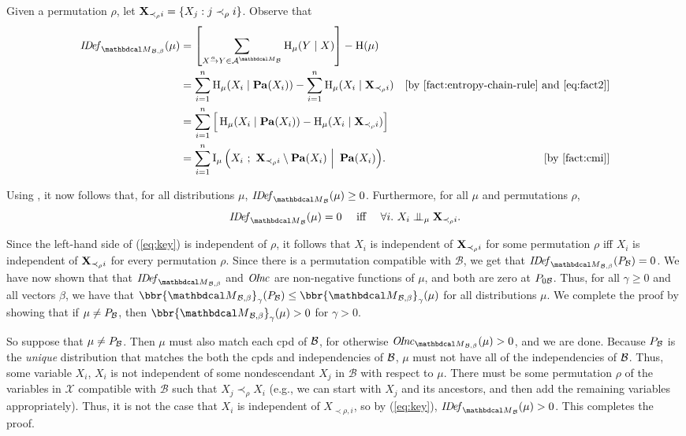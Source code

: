 \begin{subappendices}
\begin{lproof}
Given a permutation $\rho$, let ${\bf X}_{\prec_\rho i} = \{X_j: j
\prec_\rho i\}$.  Observe that 
\begin{align*}
    \IDef_{\PDGof{\mathcal B,\beta}}(\mu)
 	&= \left[\sum_{\ed aXY \in \Ar^{\PDGof{\mathcal B}}} \H_\mu(Y\mid X) \right] - \H(\mu) \\
	&= \sum_{i=1}^n \H_\mu(X_i \mid \Pa(X_i)) - \sum_{i = 1}^n
\H_\mu(X_i \mid {\bf X}_{\prec_\rho i}) & \text{[by
    \Cref{fact:entropy-chain-rule} and \eqref{eq:fact2}]}\\ 
	&= \sum_{i=1}^n \Big[\H_\mu(X_i \mid \Pa(X_i)) - \H_\mu(X_i
  \mid {\bf X}_{\prec_\rho i} )\Big] \\ 
      &= \sum_{i=1}^n \I_\mu \Big( X_i ~;~ {\bf X}_{\prec_\rho i}
    \setminus \Pa(X_i) ~\Big|~ \Pa(X_i) \Big). & \text{[by
        \Cref{fact:cmi}]} 
\end{align*}

Using , it now follows that,
for all distributions $\mu$,
$\IDef_{\PDGof{\mathcal B}}(\mu) \ge 0$.
Furthermore, for all $\mu$ and permutations $\rho$,
\begin{equation}\label{eq:key}
  \IDef_{\PDGof{\mathcal B}}(\mu) = 0 \quad\mbox{ iff }\quad 
    \forall i.~X_i \CI_\mu {\bf X}_{\prec_\rho i}.
\end{equation}

Since the left-hand side of (\ref{eq:key}) is independent of $\rho$,
it follows that $X_i$ is independent of 
${\bf X}_{\prec_\rho i}$ for some permutation $\rho$ iff $X_i$ is independent of
  ${\bf X}_{\prec_\rho i}$ for every permutation $\rho$.  Since there
is a permutation compatible with $\mathcal B$, we get that 
$\IDef_{\PDGof{\mathcal B,\beta}}(\Pr_{\cal B}) = 0$.
We have now shown that that $\IDef_{\PDGof{\mathcal B, \beta}}$ and $\OInc$ are 
non-negative functions of $\mu$, and both are zero at $\Pr_{0\cal B}$. 
Thus, for all $\gamma \geq 0$ and all vectors $\beta$, we
have that   $\bbr{\PDGof{\mathcal B, \beta}}_\gamma( \Pr_{\cal
  B}) \le \bbr{\PDGof{\mathcal B, \beta}}_\gamma( \mu)$ for all
distributions $\mu$.  We complete the proof by showing that if
$\mu \ne \Pr_{\cal B}$, then 
$\bbr{\PDGof{\mathcal B, \beta}}_\gamma(\mu) > 0$
for $\gamma > 0$.

So suppose that $\mu \ne \Pr_{\cal B}$. 
Then $\mu$ must also match each cpd of $\cal B$,
for otherwise $\OInc_{\PDGof{\mathcal B,
\beta}}(\mu) > 0$, and we are done.  
Because $\Pr_{\cal B}$ is the \emph{unique} distribution that matches the 
both the cpds and independencies of $\cal B$, $\mu$ must not have all of the 
independencies of $\cal B$. 
Thus,
some variable $X_i$, $X_i$ is not independent of some nondescendant $X_j$ in
$\mathcal B$ with respect to $\mu$.  There must be some permutation
$\rho$ of the variables in $\mathcal X$ compatible with ${\mathcal B}$
such that $X_j \prec_{\rho} X_i$ (e.g., we can start with $X_j$ and
its ancestors, and then add the remaining variables appropriately).
Thus, it is not the case that $X_i$ is independent of $X_{\prec \rho,
  i}$, so by (\ref{eq:key}), $\IDef_{\PDGof{\mathcal B}}(\mu) > 0$.
This completes the proof.
\end{lproof}


\end{subappendices}
